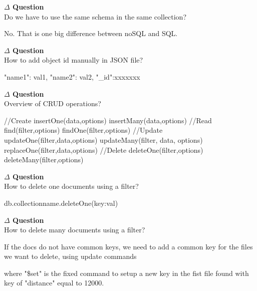 \documentclass[12pt]{article}
\newenvironment{que}
    { \begin{mdframed}[backgroundcolor=green!20] \textbf{$\Delta$ Question} \\}
    {  \end{mdframed}}
\begin{document}
\begin{que}
Do we have to use the same schema in the same collection?
\end{que}
No. That is one big difference between noSQL and SQL.
\begin{que}
How to add object id manually in JSON file?
\end{que}
\begin{code}
{
"name1": val1,
"name2": val2,
"_id":xxxxxxx}
\end{code}
\begin{que}
Overview of CRUD operations?
\end{que}
\begin{code}
//Create
insertOne(data,options)
insertMany(data,options)
//Read
find(filter,options)
findOne(filter,options)
//Update
updateOne(filter,data,options)
updateMany(filter, data, options)
replaceOne(filter,data,options)
//Delete
deleteOne(filter,options)
deleteMany(filter,options)
\end{code}
\begin{que}
How to delete one documents using a filter?
\end{que}
\begin{code}
db.collectionname.deleteOne({key:val})
\end{code}
\begin{que}
How to delete many documents using a filter?
\end{que}
If the docs do not have common keys, we need to add a common key for the files we want to delete, using update commands
where "\$set" is the fixed command to setup a new key in the fist file found with key of "distance" equal to 12000.
\end{document}
